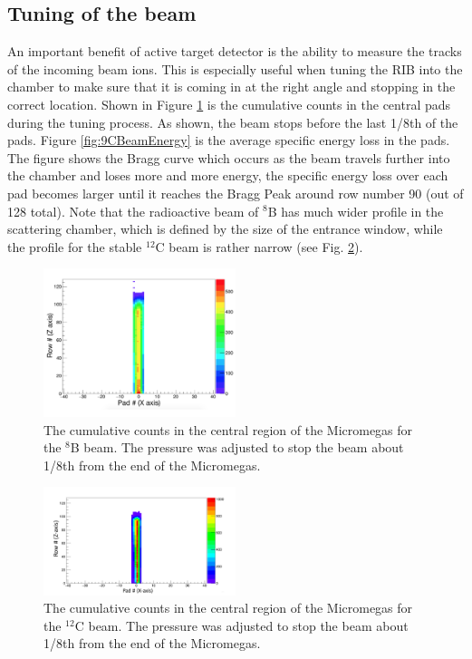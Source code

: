 \documentclass[final,number,sort&compress,5p,times,twocolumn]{elsarticle}
\begin{document}
\subsection{Tuning of the beam}

An important benefit of active target detector is the ability to measure the tracks of the incoming beam ions. This is especially useful when tuning the RIB into the chamber to make sure that it is coming in at the right angle and stopping in the correct location. Shown in Figure \ref{fig:9CBeamCumulative} is the cumulative counts in the central pads during the tuning process. As shown, the beam stops before the last 1/8th of the pads. Figure \ref{fig:9CBeamEnergy} is the average specific energy loss in the pads. The figure shows the Bragg curve which occurs as the beam travels further into the chamber and loses more and more energy, the specific energy loss over each pad becomes larger until it reaches the Bragg Peak around row number 90 (out of 128 total). Note that the radioactive beam of $^8$B has much wider profile in the scattering chamber, which is defined by the size of the entrance window, while the profile for the stable $^{12}$C beam is rather narrow (see Fig. \ref{fig:12CBeamCumulative}).

\begin{figure}[hbt!]
	\centering
    \includegraphics[width=0.5\textwidth]{figures/9CBeamCumulative}
    \caption{The cumulative counts in the central region of the Micromegas for the $^8$B beam. The pressure was adjusted to stop the beam about 1/8th from the end of the Micromegas.}
    \label{fig:9CBeamCumulative}
\end{figure}

\begin{figure}[hbt!]
	\centering
    \includegraphics[width=0.5\textwidth]{figures/12CCumulative}
    \caption{The cumulative counts in the central region of the Micromegas for the $^{12}$C beam. The pressure was adjusted to stop the beam about 1/8th from the end of the Micromegas.}
    \label{fig:12CBeamCumulative}
\end{figure}
\end{document}
